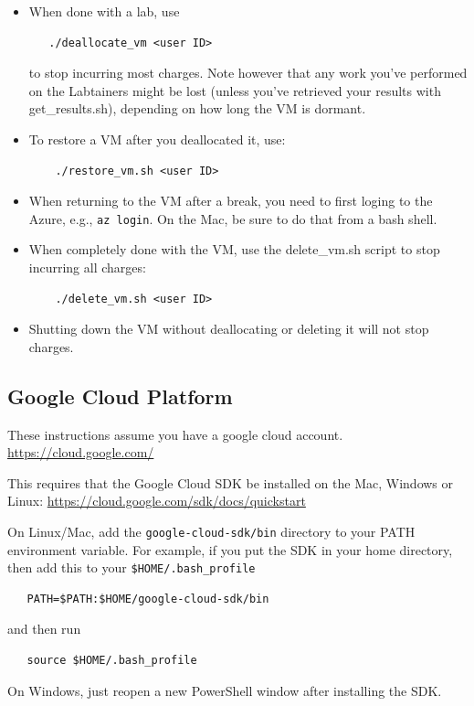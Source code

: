 \documentclass[12pt]{article}
\begin{document}
\begin{itemize}
\item When done with a lab, use
\begin{verbatim}
   ./deallocate_vm <user ID> 
\end{verbatim}
\noindent to stop incurring most charges.  Note however that any work you've performed on the Labtainers 
might be lost (unless you've retrieved your results with get\_results.sh), depending on how
long the VM is dormant.

\item To restore a VM after you deallocated it, use:
\begin{verbatim}
    ./restore_vm.sh <user ID>
\end{verbatim}

\item When returning to the VM after a break, you need to first loging to the Azure, e.g., {\tt az login}.
On the Mac, be sure to do that from a bash shell.

\item When completely done with the VM, use the delete\_vm.sh script to stop incurring all charges:
\begin{verbatim}
    ./delete_vm.sh <user ID>
\end{verbatim}

\item Shutting down the VM without deallocating or deleting it will not stop charges.
\end{itemize}

\subsection{Google Cloud Platform}
These instructions assume you have a google cloud account. \url{https://cloud.google.com/}

This requires that the Google Cloud SDK be installed on  the Mac, Windows or Linux:
\url{https://cloud.google.com/sdk/docs/quickstart}

On Linux/Mac, add the {\tt google-cloud-sdk/bin} directory to your PATH environment variable.  For example,
if you put the SDK in your home directory, then add this to your 
{\tt \$HOME/.bash\_profile}
\begin{verbatim}
   PATH=$PATH:$HOME/google-cloud-sdk/bin
\end{verbatim}
\noindent and then run
\begin{verbatim}
   source $HOME/.bash_profile
\end{verbatim}
\noindent On Windows, just reopen a new PowerShell window after installing the SDK.
\end{document}
